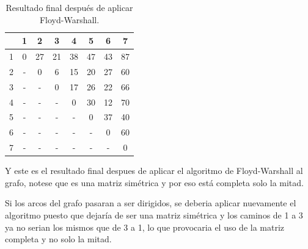 \documentclass[letterpaper,10pt]{article}
\begin{document}
\begin{enumerate}
        \begin{minipage}[t]{0.47\textwidth}
            \begin{table}[H]
                \centering
            \begin{tabular}{|c|c|c|c|c|c|c|c|}\hline
                   & 1 & 2 & 3 & 4 & 5 & 6 & 7   \\ \hline
                 1 & 0  & 27 & 21 & 38 & 47 & 43 & 87     \\\hline
                 2 & -  & 0  & 6  & 15  & 20  & 27  & 60  \\\hline
                 3 & -  & -  & 0  & 17  & 26  & 22  & 66  \\\hline
                 4 & -  & -  & -  & 0  & 30  & 12  & 70   \\\hline
                 5 & -  & -  & -  & -  & 0  & 37  & 40  \\\hline
                 6 & -  & -  & -  & -  & -  & 0  & 60   \\\hline
                 7 & -  & -  & -  & -  & -  & -  & 0   \\\hline
                \end{tabular}
                \caption{Resultado final después de aplicar Floyd-Warshall.}
                \label{tablitafloydfin}
            \end{table}
        \end{minipage}
        \newline
        
        Y este es el resultado final despues de aplicar el algoritmo de Floyd-Warshall al grafo, notese que es una matriz simétrica y por eso está completa solo la mitad. 
        
        Si los arcos del grafo pasaran a ser dirigidos, se deberia aplicar nuevamente el algoritmo puesto que dejaría de ser una matriz simétrica y los caminos de 1 a 3 ya no serian los mismos que de 3 a 1, lo que provocaria el uso de la matriz completa y no solo la mitad.
\end{enumerate}
\end{document}
